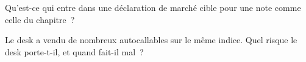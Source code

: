 \begin{interviewq}\label{iq:in:structurer-sales-and-sales-trader:5}
Qu'est-ce qui entre dans une déclaration de marché cible pour une note comme celle du chapitre~?
\end{interviewq}

\begin{interviewq}\label{iq:in:structurer-sales-and-sales-trader:6}
Le desk a vendu de nombreux autocallables sur le même indice. Quel risque le desk porte-t-il, et quand fait-il mal~?
\end{interviewq}
